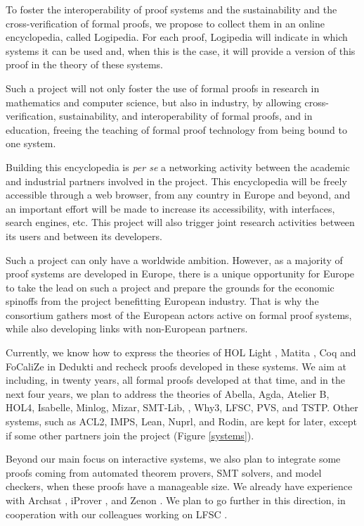 To foster the interoperability of proof systems and the sustainability
and the cross-verification of formal proofs, we propose to collect
them in an online encyclopedia, called {\sc Logipedia}.  For each
proof, {\sc Logipedia} will indicate in which systems it can be used
and, when this is the case, it will provide a version of this proof in
the theory of these systems.

Such a project will not only foster the use of
formal proofs in research in mathematics and computer science, but
also in industry, by allowing cross-verification, sustainability, and
interoperability of formal proofs, and in education, freeing the
teaching of formal proof technology from being bound to one system. 

Building this encyclopedia is {\em per se} a networking activity
between the academic and industrial partners involved in the project.
This encyclopedia will be freely accessible through a web browser,
from any country in Europe and beyond, and an important effort will be
made to increase its accessibility, with interfaces, search engines,
etc.  This project will also trigger joint research activities between
its users and between its developers.

Such a project can only have a worldwide ambition. However, as a
majority of proof systems are developed in Europe, there is a unique
opportunity for Europe to take the lead on such a project and prepare
the grounds for the economic spinoffs from the project benefitting
European industry. That is why the consortium gathers most of the
European actors active on formal proof systems, while also developing
links with non-European partners.

Currently, we know how to express the theories of {\sc HOL Light}
\cite{Assaf12}, {\sc Matita} \cite{Assaf15}, {\sc Coq} and {\sc FoCaliZe}
\cite{Cauderlier16} in {\sc
  Dedukti} and recheck proofs developed in these systems.  We aim at
including, in twenty years, all formal proofs developed at that time,
and in the next four years, we plan to address the theories of {\sc
  Abella}, {\sc Agda}, {\sc Atelier B}, {\sc HOL4}, {\sc Isabelle},
{\sc Minlog}, {\sc Mizar}, {\sc SMT-Lib}, \tlaplus, {\sc Why3}, {\sc
  LFSC}, {\sc PVS}, and {\sc TSTP}.  Other systems, such as {\sc
  ACL2}, {\sc IMPS}, {\sc Lean}, {\sc Nuprl}, and {\sc Rodin}, are
kept for later, except if some other partners join the project (Figure
\ref{systems}).

Beyond our main focus on interactive systems, we also plan to
integrate some proofs coming from automated theorem provers, SMT
solvers, and model checkers, when these proofs have a manageable
size. We already have experience with Archsat \cite{Bury19}, iProver
\cite{Burel10}, and Zenon \cite{CauderlierHalmagrand15}. We plan to go
further in this direction, in cooperation with our colleagues working
on LFSC \cite{Stump09}.

